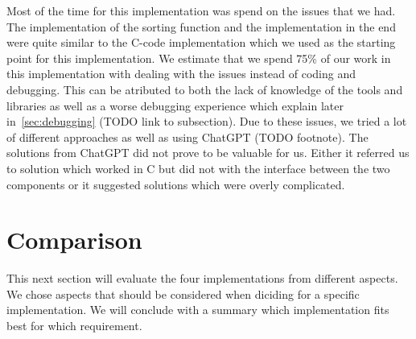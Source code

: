 \documentclass[conference]{IEEEtran}
\begin{document}
Most of the time for this implementation was spend on the issues that we had. The implementation of the sorting function and the implementation in the end were quite similar to the C-code implementation which we used as the starting point for this implementation. We estimate that we spend 75\% of our work in this implementation with dealing with the issues instead of coding and debugging. This can be atributed to both the lack of knowledge of the tools and libraries as well as a worse debugging experience which explain later in~\ref{sec:debugging} (TODO link to subsection). Due to these issues, we tried a lot of different approaches as well as using ChatGPT (TODO footnote). The solutions from ChatGPT did not prove to be valuable for us. Either it referred us to solution which worked in C but did not with the interface between the two components or it suggested solutions which were overly complicated.

\section{Comparison}
This next section will evaluate the four implementations from different aspects. We chose aspects that should be considered when diciding for a specific implementation. We will conclude with a summary which implementation fits best for which requirement.
\end{document}
